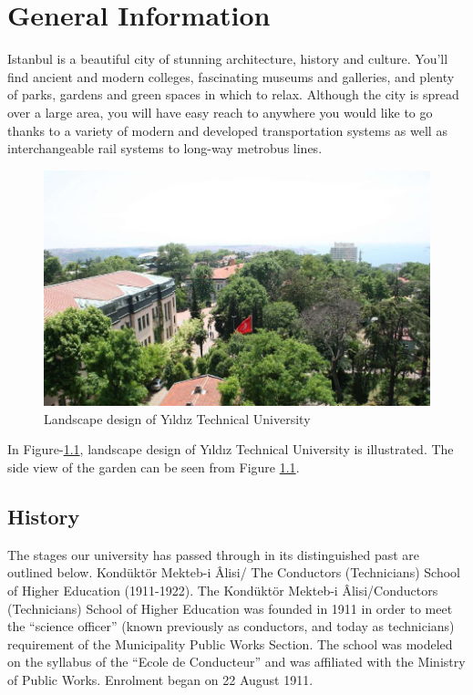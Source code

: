 \chapter{General Information}
Istanbul is a beautiful city of stunning architecture, history and culture. You'll find ancient and modern colleges, fascinating museums and galleries, and plenty of parks, gardens and green spaces in which to relax. Although the city is spread over a large area, you will have easy reach to anywhere you would like to go thanks to a variety of modern and developed transportation systems as well as interchangeable rail systems to long-way metrobus lines.

\begin{figure}[!htbp]
\centering
\includegraphics[width=\textwidth]{projectChapters/images/Picture1.png}
\caption{Landscape design of Yıldız Technical University}
\label{fig:ornek1}
\end{figure}

In Figure-\ref{fig:ornek1}, landscape design of Yıldız Technical University is illustrated. The side view of the garden can be seen from Figure \ref{fig:ornek1}.

\section{History}
The stages our university has passed through\cite{WinNT} in its distinguished past are outlined below. Kondüktör Mekteb-i Âlisi/ The Conductors (Technicians) School of Higher Education (1911-1922). The Kondüktör Mekteb-i Âlisi/Conductors (Technicians) School of Higher Education was founded in 1911 in order to meet the “science officer” (known previously as conductors, and today as technicians) requirement of the Municipality Public Works Section. The school was modeled on the syllabus of the “Ecole de Conducteur” and was affiliated with the Ministry of Public Works. Enrolment began on 22 August 1911.


